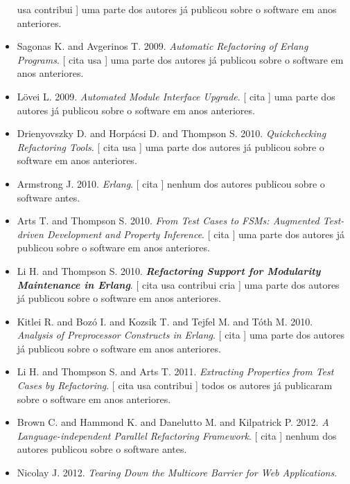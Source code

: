 \begin{itemize}
          usa
          contribui
      ]
uma parte dos autores já publicou sobre o software em anos anteriores.
\item Sagonas K. and Avgerinos T.
      2009.
        \textit{ Automatic Refactoring of Erlang Programs}.
      [
          cita
          usa
      ]
uma parte dos autores já publicou sobre o software em anos anteriores.
\item L\"{o}vei L.
      2009.
        \textit{ Automated Module Interface Upgrade}.
      [
          cita
      ]
uma parte dos autores já publicou sobre o software em anos anteriores.
\item Drienyovszky D. and Horp\'{a}csi D. and Thompson S.
      2010.
        \textit{ Quickchecking Refactoring Tools}.
      [
          cita
          usa
      ]
uma parte dos autores já publicou sobre o software em anos anteriores.
\item Armstrong J.
      2010.
        \textit{ Erlang}.
      [
          cita
      ]
nenhum dos autores publicou sobre o software antes.
\item Arts T. and Thompson S.
      2010.
        \textit{ From Test Cases to FSMs: Augmented Test-driven Development and Property Inference}.
      [
          cita
      ]
uma parte dos autores já publicou sobre o software em anos anteriores.
\item Li H. and Thompson S.
      2010.
        \textbf{\textit{ Refactoring Support for Modularity Maintenance in Erlang}}.
      [
          cita
          usa
          contribui
          cria
      ]
uma parte dos autores já publicou sobre o software em anos anteriores.
\item Kitlei R. and Boz\'{o} I. and Kozsik T. and Tejfel M. and T\'{o}th M.
      2010.
        \textit{ Analysis of Preprocessor Constructs in Erlang}.
      [
          cita
      ]
uma parte dos autores já publicou sobre o software em anos anteriores.
\item Li H. and Thompson S. and Arts T.
      2011.
        \textit{ Extracting Properties from Test Cases by Refactoring}.
      [
          cita
          usa
          contribui
      ]
todos os autores já publicaram sobre o software em anos anteriores.
\item Brown C. and Hammond K. and Danelutto M. and Kilpatrick P.
      2012.
        \textit{ A Language-independent Parallel Refactoring Framework}.
      [
          cita
      ]
nenhum dos autores publicou sobre o software antes.
\item Nicolay J.
      2012.
        \textit{ Tearing Down the Multicore Barrier for Web Applications}.

\end{itemize}
